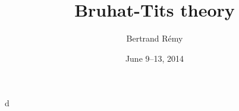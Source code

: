 \documentclass{article}
\title{Bruhat-Tits theory}
\author{Bertrand R\'emy}
\date{June 9--13, 2014}
\begin{document}
\maketitle





d
\end{document}
